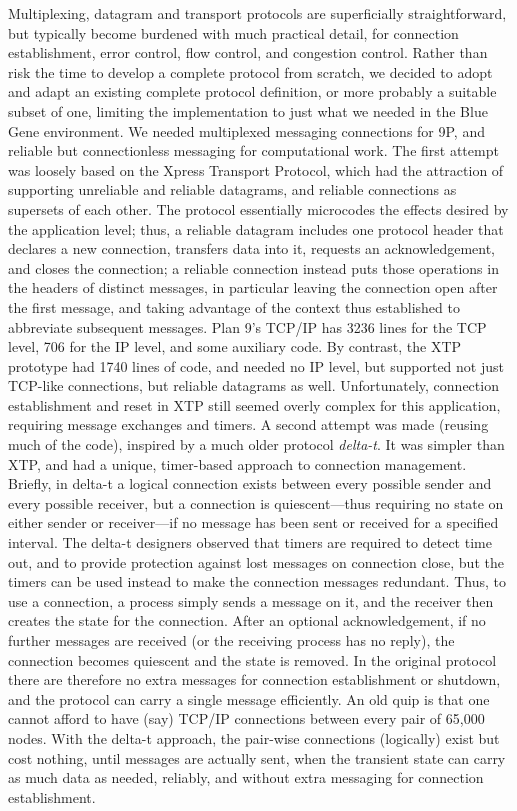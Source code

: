 Multiplexing, datagram and transport protocols are superficially
straightforward, but typically become burdened with much practical
detail, for connection establishment, error control, flow control, and
congestion control. %
Rather than risk the time to develop a complete protocol from scratch,
we decided to adopt and adapt an existing complete protocol
definition, or more probably a suitable subset of one, limiting the
implementation to just what we needed in the Blue Gene environment.
We needed multiplexed messaging connections for 9P, and reliable but
connectionless messaging for computational work.  The first attempt
was loosely based on the Xpress Transport Protocol,\cite{xtp} which
had the attraction of supporting unreliable and reliable datagrams,
and reliable connections as supersets of each other.  The protocol
essentially microcodes the effects desired by the application level;
thus, a reliable datagram includes one protocol header that declares a
new connection, transfers data into it, requests an acknowledgement,
and closes the connection; a reliable connection instead puts those
operations in the headers of distinct messages, in particular leaving
the connection open after the first message, and taking advantage of
the context thus established to abbreviate subsequent messages.  Plan
9's TCP/IP has 3236 lines for the TCP level, 706 for the IP level, and
some auxiliary code.  By contrast, the XTP prototype had 1740 lines of
code, and needed no IP level, but supported not just TCP-like
connections, but reliable datagrams as well.  Unfortunately,
connection establishment and reset in XTP still seemed overly complex
for this application, requiring message exchanges and timers.  A
second attempt was made (reusing much of the code), inspired by a much
older protocol \emph{delta-t}.\cite{watson1989delta} It was simpler than XTP,
and had a unique, timer-based approach to connection management.
Briefly, in delta-t a logical connection exists between every possible
sender and every possible receiver, but a connection is
quiescent---thus requiring no state on either sender or receiver---if
no message has been sent or received for a specified interval.  The
delta-t designers observed that timers are required to detect time
out, and to provide protection against lost messages on connection
close, but the timers can be used instead to make the connection
messages redundant.  Thus, to use a connection, a process simply sends
a message on it, and the receiver then creates the state for the
connection. After an optional acknowledgement, if no further messages
are received (or the receiving process has no reply), the connection
becomes quiescent and the state is removed. In the original protocol
there are therefore no extra messages for connection establishment or
shutdown, and the protocol can carry a single message efficiently.  An
old quip is that one cannot afford to have (say) TCP/IP connections
between every pair of 65,000 nodes.  With the delta-t approach, the
pair-wise connections (logically) exist but cost nothing, until
messages are actually sent, when the transient state can carry as much
data as needed, reliably, and without extra messaging for connection
establishment.

